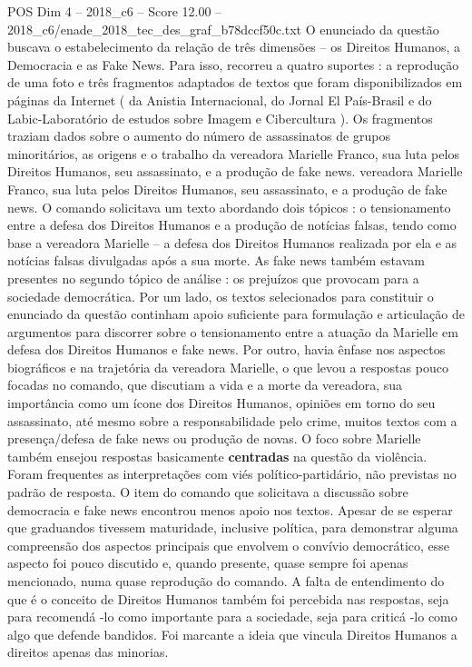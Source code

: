 \begin{textsample}{POS Dim 4 – 2018\_c6 – Score 12.00 – 2018\_c6/enade\_2018\_tec\_des\_graf\_b78dccf50c.txt}
O enunciado da questão buscava o estabelecimento da relação de três dimensões – os Direitos Humanos, a Democracia e as Fake News.
Para isso, recorreu a quatro suportes : a reprodução de uma foto e três fragmentos adaptados de textos que foram disponibilizados em páginas da Internet ( da Anistia Internacional, do Jornal El País-Brasil e do Labic-Laboratório de estudos sobre Imagem e Cibercultura ).
Os fragmentos traziam dados sobre o aumento do número de assassinatos de grupos minoritários, as origens e o trabalho da vereadora Marielle Franco, sua luta pelos Direitos Humanos, seu assassinato, e a produção de fake news. vereadora Marielle Franco, sua luta pelos Direitos Humanos, seu assassinato, e a produção de fake news.
O comando solicitava um texto abordando dois tópicos : o tensionamento entre a defesa dos Direitos Humanos e a produção de notícias falsas, tendo como base a vereadora Marielle – a defesa dos Direitos Humanos realizada por ela e as notícias falsas divulgadas após a sua morte.
As fake news também estavam presentes no segundo tópico de análise : os prejuízos que provocam para a sociedade democrática.
Por um lado, os textos selecionados para constituir o enunciado da questão continham apoio suficiente para formulação e articulação de argumentos para discorrer sobre o tensionamento entre a atuação da Marielle em defesa dos Direitos Humanos e fake news.
Por outro, havia ênfase nos aspectos biográficos e na trajetória da vereadora Marielle, o que levou a respostas pouco focadas no comando, que discutiam a vida e a morte da vereadora, sua importância como um ícone dos Direitos Humanos, opiniões em torno do seu assassinato, até mesmo sobre a responsabilidade pelo crime, muitos textos com a presença/defesa de fake news ou produção de novas.
O foco sobre Marielle também ensejou respostas basicamente \textbf{centradas} na questão da violência.
Foram frequentes as interpretações com viés político-partidário, não previstas no padrão de resposta.
O item do comando que solicitava a discussão sobre democracia e fake news encontrou menos apoio nos textos.
Apesar de se esperar que graduandos tivessem maturidade, inclusive política, para demonstrar alguma compreensão dos aspectos principais que envolvem o convívio democrático, esse aspecto foi pouco discutido e, quando presente, quase sempre foi apenas mencionado, numa quase reprodução do comando.
A falta de entendimento do que é o conceito de Direitos Humanos também foi percebida nas respostas, seja para recomendá -lo como importante para a sociedade, seja para criticá -lo como algo que defende bandidos.
Foi marcante a ideia que vincula Direitos Humanos a direitos apenas das minorias.

\end{textsample}
